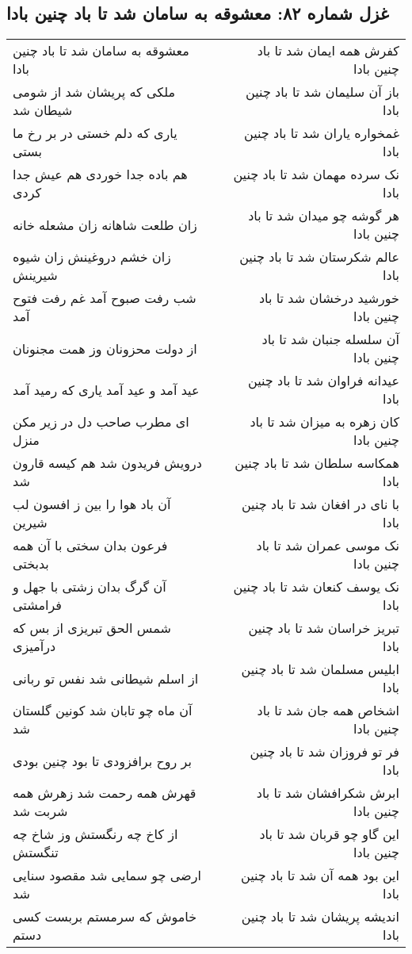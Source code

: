 \begin{center}
\section*{غزل شماره ۸۲: معشوقه به سامان شد تا باد چنین بادا}
\label{sec:0082}
\begin{longtable}{l p{0.5cm} r}
معشوقه به سامان شد تا باد چنین بادا
&&
کفرش همه ایمان شد تا باد چنین بادا
\\
ملکی که پریشان شد از شومی شیطان شد
&&
باز آن سلیمان شد تا باد چنین بادا
\\
یاری که دلم خستی در بر رخ ما بستی
&&
غمخواره یاران شد تا باد چنین بادا
\\
هم باده جدا خوردی هم عیش جدا کردی
&&
نک سرده مهمان شد تا باد چنین بادا
\\
زان طلعت شاهانه زان مشعله خانه
&&
هر گوشه چو میدان شد تا باد چنین بادا
\\
زان خشم دروغینش زان شیوه شیرینش
&&
عالم شکرستان شد تا باد چنین بادا
\\
شب رفت صبوح آمد غم رفت فتوح آمد
&&
خورشید درخشان شد تا باد چنین بادا
\\
از دولت محزونان وز همت مجنونان
&&
آن سلسله جنبان شد تا باد چنین بادا
\\
عید آمد و عید آمد یاری که رمید آمد
&&
عیدانه فراوان شد تا باد چنین بادا
\\
ای مطرب صاحب دل در زیر مکن منزل
&&
کان زهره به میزان شد تا باد چنین بادا
\\
درویش فریدون شد هم کیسه قارون شد
&&
همکاسه سلطان شد تا باد چنین بادا
\\
آن باد هوا را بین ز افسون لب شیرین
&&
با نای در افغان شد تا باد چنین بادا
\\
فرعون بدان سختی با آن همه بدبختی
&&
نک موسی عمران شد تا باد چنین بادا
\\
آن گرگ بدان زشتی با جهل و فرامشتی
&&
نک یوسف کنعان شد تا باد چنین بادا
\\
شمس الحق تبریزی از بس که درآمیزی
&&
تبریز خراسان شد تا باد چنین بادا
\\
از اسلم شیطانی شد نفس تو ربانی
&&
ابلیس مسلمان شد تا باد چنین بادا
\\
آن ماه چو تابان شد کونین گلستان شد
&&
اشخاص همه جان شد تا باد چنین بادا
\\
بر روح برافزودی تا بود چنین بودی
&&
فر تو فروزان شد تا باد چنین بادا
\\
قهرش همه رحمت شد زهرش همه شربت شد
&&
ابرش شکرافشان شد تا باد چنین بادا
\\
از کاخ چه رنگستش وز شاخ چه تنگستش
&&
این گاو چو قربان شد تا باد چنین بادا
\\
ارضی چو سمایی شد مقصود سنایی شد
&&
این بود همه آن شد تا باد چنین بادا
\\
خاموش که سرمستم بربست کسی دستم
&&
اندیشه پریشان شد تا باد چنین بادا
\\
\end{longtable}
\end{center}

